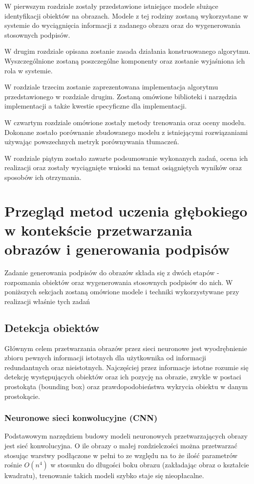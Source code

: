 W pierwszym rozdziale zostały przedstawione istniejące modele służące identyfikacji obiektów na obrazach. Modele z tej rodziny zostaną wykorzystane w systemie do wyciągnięcia informacji z zadanego obrazu oraz do wygenerowania stosownych podpisów. \par
W drugim rozdziale opisana zostanie zasada działania konstruowanego algorytmu. Wyszczególnione zostaną poszczególne komponenty oraz zostanie wyjaśniona ich rola w systemie. \par
W rozdziale trzecim zostanie zaprezentowana implementacja algorytmu przedstawionego w rozdziale drugim. Zostaną omówione biblioteki i narzędzia implementacji a także kwestie specyficzne dla implementacji. \par
W czwartym rozdziale omówione zostały metody trenowania oraz oceny modelu. Dokonane zostało porównanie zbudowanego modelu z istniejącymi rozwiązaniami używając powszechnych metryk porównywania tłumaczeń. \par
W rozdziale piątym zostało zawarte podsumowanie wykonanych zadań, ocena ich realizacji oraz zostały wyciągnięte wnioski na temat osiągniętych wyników oraz sposobów ich otrzymania.

\newpage 
 
\section{Przegląd metod uczenia głębokiego w kontekście przetwarzania obrazów i generowania podpisów}
Zadanie generowania podpisów do obrazów składa się z dwóch etapów - rozpoznania obiektów oraz wygenerowania stosownych podpisów do nich. W poniższych sekcjach zostaną omówione modele i techniki wykorzystywane przy realizacji właśnie tych zadań
\subsection{Detekcja obiektów}
Głównym celem przetwarzania obrazów przez sieci neuronowe jest wyodrębnienie zbioru pewnych informacji istotnych dla użytkownika od informacji redundantnych oraz nieistotnych. Najczęściej przez informacje istotne rozumie się detekcję występujących obiektów oraz ich pozycję na obrazie, zwykle w postaci prostokąta (bounding box) oraz prawdopodobieństwa wykrycia obiektu w danym prostokącie.
\subsubsection{Neuronowe sieci konwolucyjne (CNN)}
Podstawowym narzędziem budowy modeli neuronowych przetwarzających obrazy jest sieć konwolucyjna. O ile obrazy o małej rozdzielczości można przetwarzać stosując warstwy podłączone w pełni to ze względu na to że ilość parametrów rośnie $O(n^4)$ w stosunku do długości boku obrazu (zakładając obraz o kształcie kwadratu), trenowanie takich modeli szybko staje się nieopłacalne.

